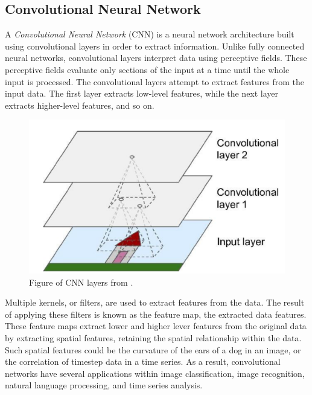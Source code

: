 \subsection{Convolutional Neural Network}
\label{section:BT:CNN}
A \textit{Convolutional Neural Network} (CNN) is a neural network architecture built using convolutional layers in order to extract information.
Unlike fully connected neural networks, convolutional layers interpret data using perceptive fields.
These perceptive fields evaluate only sections of the input at a time until the whole input is processed.
The convolutional layers attempt to extract features from the input data.
The first layer extracts low-level features, while the next layer extracts higher-level features, and so on.

\cite[p.~443-446]{Geron2017}


\begin{figure}[h!]
    \centering
    \includegraphics[width=\textwidth]{./sections/BT/figures/convolution_hands_one_machine_learning.png}
    \hfill
    \caption{Figure of CNN layers from \cite[p.~444]{Geron2017}.}
    \label{fig:convolution}
\end{figure}


Multiple kernels, or filters, are used to extract features from the data.
The result of applying these filters is known as the feature map, the extracted data features.
These feature maps extract lower and higher lever features from the original data by
extracting spatial features, retaining the spatial relationship within the data.
Such spatial features could be the curvature of the ears of a dog in an image, or the correlation of timestep data in a time series.
As a result, convolutional networks have several applications within image classification,
image recognition, natural language processing, and time series analysis.

